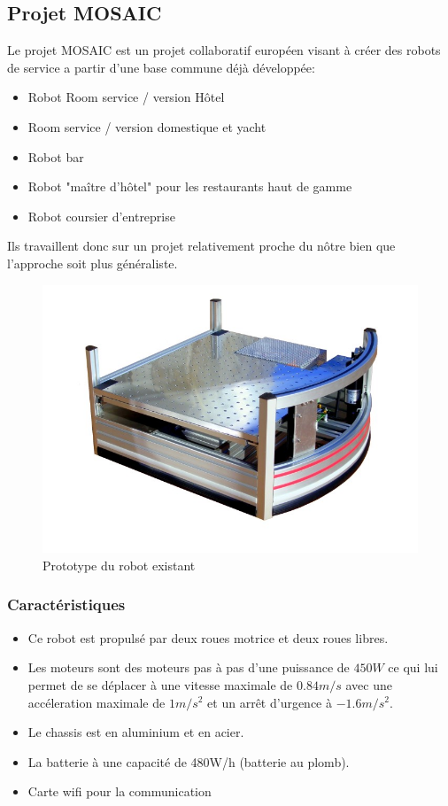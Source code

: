 \subsection*{Projet MOSAIC}

Le projet MOSAIC est un projet collaboratif européen visant à créer
des robots de service a partir d'une base commune déjà développée:

\begin{itemize}
\item Robot Room service / version Hôtel
\item Room service / version domestique et yacht
\item Robot bar
\item Robot "maître d'hôtel" pour les restaurants haut de gamme
\item Robot coursier d’entreprise
\end{itemize}

Ils travaillent donc sur un projet relativement proche du nôtre bien
que l'approche soit plus généraliste.

\begin{figure}[h]
\begin{center}
\includegraphics[scale=0.55]{Images/robot_mosaic}
\caption{Prototype du robot existant}
\label{Prototype du robot existant}
\end{center}
\end{figure} 

\subsubsection*{Caractéristiques}
\begin{itemize}
\item Ce robot est propulsé par deux roues motrice et deux roues libres.
\item Les moteurs sont des moteurs pas à pas d'une puissance de $450W$
  ce qui lui permet de se déplacer à une vitesse maximale de $0.84m/s$
  avec une accéleration maximale de $1m/s^2$ et un arrêt d'urgence à
  $-1.6m/s^2$.
\item Le chassis est en aluminium et en acier.
\item La batterie à une capacité de 480W/h (batterie au plomb).
\item Carte wifi pour la communication
\end{itemize}


